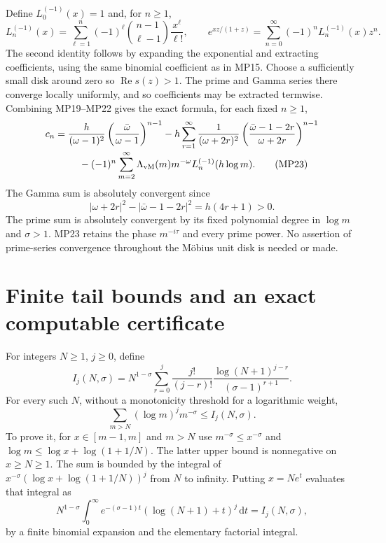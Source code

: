 \documentclass[11pt]{article}
\newcommand{\dd}{\,\mathrm d}
\newcommand{\Rea}{\operatorname{Re}}
\newcommand{\vM}{\Lambda_{\mathrm{vM}}}
\begin{document}
Define $L_0^{(-1)}(x)=1$ and, for $n\geq1$,
\begin{equation}
 L_n^{(-1)}(x)=\sum_{\ell=1}^n(-1)^\ell
             \binom{n-1}{\ell-1}\frac{x^\ell}{\ell!},\qquad
 e^{xz/(1+z)}=\sum_{n=0}^\infty(-1)^nL_n^{(-1)}(x)z^n.
 \tag{MP22}
\end{equation}
The second identity follows by expanding the exponential and extracting
coefficients, using the same binomial coefficient as in MP15.
Choose a sufficiently small disk around zero so $\Rea s(z)>1$.
The prime and Gamma series there converge locally uniformly, and so
coefficients may be extracted termwise. Combining MP19--MP22 gives the
exact formula, for each fixed $n\geq1$,
\begin{align}
 c_n={}&\frac h{(\omega-1)^2}
                \left(\frac{\bar\omega}{\omega-1}\right)^{n-1}
 -h\sum_{r=1}^\infty\frac1{(\omega+2r)^2}
             \left(\frac{\bar\omega-1-2r}{\omega+2r}\right)^{n-1}
 \notag\\[-2pt]
 &\hspace{4mm}-(-1)^n\sum_{m=2}^\infty
           \vM(m)m^{-\omega}L_n^{(-1)}(h\log m).
 \tag{MP23}
\end{align}
The Gamma sum is absolutely convergent since
\begin{equation}
 |\omega+2r|^2-|\bar\omega-1-2r|^2=h(4r+1)>0.
 \tag{MP24}
\end{equation}
The prime sum is absolutely convergent by its fixed polynomial degree in
$\log m$ and $\sigma>1$. MP23 retains the phase $m^{-i\tau}$ and
every prime power. No assertion of prime-series convergence throughout
the Möbius unit disk is needed or made.

\section{Finite tail bounds and an exact computable certificate}
For integers $N\geq1$, $j\geq0$, define
\begin{equation}
 I_j(N,\sigma)=N^{1-\sigma}\sum_{r=0}^j
       \frac{j!}{(j-r)!}\frac{\log(N+1)^{j-r}}{(\sigma-1)^{r+1}}.
 \tag{MP25}
\end{equation}
For every such $N$, without a monotonicity threshold for a logarithmic
weight,
\begin{equation}
 \sum_{m>N}(\log m)^j m^{-\sigma}\leq I_j(N,\sigma).
 \tag{MP26}
\end{equation}
To prove it, for $x\in[m-1,m]$ and $m>N$ use
$m^{-\sigma}\leq x^{-\sigma}$ and
$\log m\leq\log x+\log(1+1/N)$. The latter upper bound is
nonnegative on $x\geq N\geq1$. The sum is bounded by the integral of
$x^{-\sigma}(\log x+\log(1+1/N))^j$ from $N$ to infinity.
Putting $x=Ne^t$ evaluates that integral as
\[
 N^{1-\sigma}\int_0^\infty e^{-(\sigma-1)t}
                     (\log(N+1)+t)^j\dd t=I_j(N,\sigma),
\]
by a finite binomial expansion and the elementary factorial integral.
\end{document}
